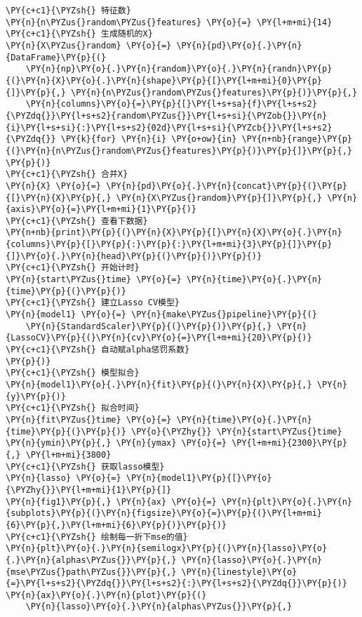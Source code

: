 \begin{Verbatim}[commandchars=\\\{\}]
\PY{c+c1}{\PYZsh{} 特征数}
\PY{n}{n\PYZus{}random\PYZus{}features} \PY{o}{=} \PY{l+m+mi}{14}
\PY{c+c1}{\PYZsh{} 生成随机的X}
\PY{n}{X\PYZus{}random} \PY{o}{=} \PY{n}{pd}\PY{o}{.}\PY{n}{DataFrame}\PY{p}{(}
    \PY{n}{np}\PY{o}{.}\PY{n}{random}\PY{o}{.}\PY{n}{randn}\PY{p}{(}\PY{n}{X}\PY{o}{.}\PY{n}{shape}\PY{p}{[}\PY{l+m+mi}{0}\PY{p}{]}\PY{p}{,} \PY{n}{n\PYZus{}random\PYZus{}features}\PY{p}{)}\PY{p}{,}
    \PY{n}{columns}\PY{o}{=}\PY{p}{[}\PY{l+s+sa}{f}\PY{l+s+s2}{\PYZdq{}}\PY{l+s+s2}{random\PYZus{}}\PY{l+s+si}{\PYZob{}}\PY{n}{i}\PY{l+s+si}{:}\PY{l+s+s2}{02d}\PY{l+s+si}{\PYZcb{}}\PY{l+s+s2}{\PYZdq{}} \PY{k}{for} \PY{n}{i} \PY{o+ow}{in} \PY{n+nb}{range}\PY{p}{(}\PY{n}{n\PYZus{}random\PYZus{}features}\PY{p}{)}\PY{p}{]}\PY{p}{,}
\PY{p}{)}
\PY{c+c1}{\PYZsh{} 合并X}
\PY{n}{X} \PY{o}{=} \PY{n}{pd}\PY{o}{.}\PY{n}{concat}\PY{p}{(}\PY{p}{[}\PY{n}{X}\PY{p}{,} \PY{n}{X\PYZus{}random}\PY{p}{]}\PY{p}{,} \PY{n}{axis}\PY{o}{=}\PY{l+m+mi}{1}\PY{p}{)}
\PY{c+c1}{\PYZsh{} 查看下数据}
\PY{n+nb}{print}\PY{p}{(}\PY{n}{X}\PY{p}{[}\PY{n}{X}\PY{o}{.}\PY{n}{columns}\PY{p}{[}\PY{p}{:}\PY{p}{:}\PY{l+m+mi}{3}\PY{p}{]}\PY{p}{]}\PY{o}{.}\PY{n}{head}\PY{p}{(}\PY{p}{)}\PY{p}{)}
\PY{c+c1}{\PYZsh{} 开始计时}
\PY{n}{start\PYZus{}time} \PY{o}{=} \PY{n}{time}\PY{o}{.}\PY{n}{time}\PY{p}{(}\PY{p}{)}
\PY{c+c1}{\PYZsh{} 建立Lasso CV模型}
\PY{n}{model1} \PY{o}{=} \PY{n}{make\PYZus{}pipeline}\PY{p}{(}
    \PY{n}{StandardScaler}\PY{p}{(}\PY{p}{)}\PY{p}{,} \PY{n}{LassoCV}\PY{p}{(}\PY{n}{cv}\PY{o}{=}\PY{l+m+mi}{20}\PY{p}{)} \PY{c+c1}{\PYZsh{} 自动赋alpha惩罚系数}
\PY{p}{)}
\PY{c+c1}{\PYZsh{} 模型拟合}
\PY{n}{model1}\PY{o}{.}\PY{n}{fit}\PY{p}{(}\PY{n}{X}\PY{p}{,} \PY{n}{y}\PY{p}{)}
\PY{c+c1}{\PYZsh{} 拟合时间}
\PY{n}{fit\PYZus{}time} \PY{o}{=} \PY{n}{time}\PY{o}{.}\PY{n}{time}\PY{p}{(}\PY{p}{)} \PY{o}{\PYZhy{}} \PY{n}{start\PYZus{}time}
\PY{n}{ymin}\PY{p}{,} \PY{n}{ymax} \PY{o}{=} \PY{l+m+mi}{2300}\PY{p}{,} \PY{l+m+mi}{3800}
\PY{c+c1}{\PYZsh{} 获取lasso模型}
\PY{n}{lasso} \PY{o}{=} \PY{n}{model1}\PY{p}{[}\PY{o}{\PYZhy{}}\PY{l+m+mi}{1}\PY{p}{]}
\PY{n}{fig1}\PY{p}{,} \PY{n}{ax} \PY{o}{=} \PY{n}{plt}\PY{o}{.}\PY{n}{subplots}\PY{p}{(}\PY{n}{figsize}\PY{o}{=}\PY{p}{(}\PY{l+m+mi}{6}\PY{p}{,}\PY{l+m+mi}{6}\PY{p}{)}\PY{p}{)}
\PY{c+c1}{\PYZsh{} 绘制每一折下mse的值}
\PY{n}{plt}\PY{o}{.}\PY{n}{semilogx}\PY{p}{(}\PY{n}{lasso}\PY{o}{.}\PY{n}{alphas\PYZus{}}\PY{p}{,} \PY{n}{lasso}\PY{o}{.}\PY{n}{mse\PYZus{}path\PYZus{}}\PY{p}{,} \PY{n}{linestyle}\PY{o}{=}\PY{l+s+s2}{\PYZdq{}}\PY{l+s+s2}{:}\PY{l+s+s2}{\PYZdq{}}\PY{p}{)}
\PY{n}{ax}\PY{o}{.}\PY{n}{plot}\PY{p}{(}
    \PY{n}{lasso}\PY{o}{.}\PY{n}{alphas\PYZus{}}\PY{p}{,}

\end{Verbatim}

